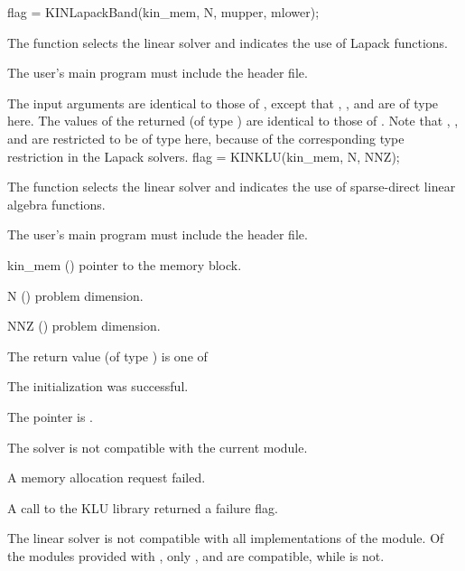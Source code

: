 {
  flag = KINLapackBand(kin\_mem, N, mupper, mlower);
}
{
  The function  selects the {\kinband} linear solver and
  indicates the use of Lapack functions. 

  The user's main program must include the  header file.
}
{
  The input arguments are identical to those of , except
  that , , and  are of type  here.
}
{
  The values of the returned  (of type ) are identical
  to those of .
}
{
  Note that , , and  are restricted to be of type 
  here, because of the corresponding type restriction in the Lapack solvers.
}
{
  flag = KINKLU(kin\_mem, N, NNZ);
}
{
  The function  selects the {\kinklu} linear solver and indicates
  the use of sparse-direct linear algebra functions. 

  The user's main program must include the  header file.
}
{
  \begin{args}
  \item[kin\_mem] ()
    pointer to the {\kinsol} memory block.
  \item[N] ()
    problem dimension.
  \item[NNZ] ()
    problem dimension.
  \end{args}
}
{
  The return value  (of type ) is one of
  \begin{args}
  \item[\Id{KINSLS\_SUCCESS}] 
    The {\kinklu} initialization was successful.
  \item[\Id{KINSLS\_MEM\_NULL}]
    The  pointer is .
  \item[\Id{KINSLS\_ILL\_INPUT}]
    The {\kinklu} solver is not compatible with the current {\nvector} module.
  \item[\Id{KINSLS\_MEM\_FAIL}]
    A memory allocation request failed.
  \item[\Id{KINSLS\_PACKAGE\_FAIL}]
    A call to the KLU library returned a failure flag.
  \end{args}
}
{
  The {\kinklu} linear solver is not compatible with all
  implementations of the {\nvector} module.  Of the {\nvector} modules
  provided with {\sundials}, only {\nvecs}, {\nvecopenmp} and
  {\nvecpthreads} are compatible, while {\nvecp} is not.
}
